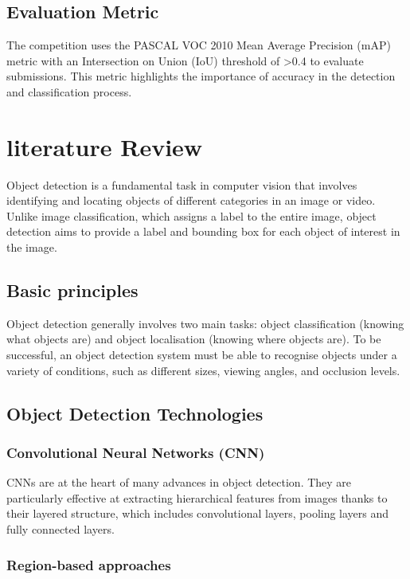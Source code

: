 \documentclass[12pt,oneside]{book} %
\begin{document}
\section{Evaluation Metric}

The competition uses the PASCAL VOC 2010 Mean Average Precision (mAP) metric
with an Intersection on Union (IoU) threshold of >0.4 to evaluate submissions.
This metric highlights the importance of accuracy in the detection and
classification process.

\chapter{literature Review}

Object detection is a fundamental task in computer vision that involves
identifying and locating objects of different categories in an image or video.
Unlike image classification, which assigns a label to the entire image, object
detection aims to provide a label and bounding box for each object of interest
in the image.

\section{Basic principles}

Object detection generally involves two main tasks: object classification
(knowing what objects are) and object localisation (knowing where objects are).
To be successful, an object detection system must be able to recognise objects
under a variety of conditions, such as different sizes, viewing angles, and
occlusion levels.

\section{Object Detection Technologies}

\subsection{Convolutional Neural Networks (CNN)}

CNNs are at the heart of many advances in object detection. They are
particularly effective at extracting hierarchical features from images thanks
to their layered structure, which includes convolutional layers, pooling layers
and fully connected layers.

\subsection{Region-based approaches}
\end{document}
